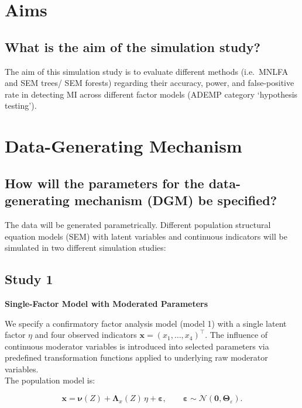 \documentclass[
  man,
  floatsintext]{apa7}
\begin{document}
\section{Aims}\label{aims}

\subsection{What is the aim of the simulation
study?}\label{what-is-the-aim-of-the-simulation-study}

The aim of this simulation study is to evaluate different methods
(i.e.~MNLFA and SEM trees/ SEM forests) regarding their accuracy, power,
and false-positive rate in detecting MI across different factor models
(ADEMP category `hypothesis testing').

\section{Data-Generating Mechanism}\label{data-generating-mechanism}

\subsection{How will the parameters for the data-generating mechanism
(DGM) be
specified?}\label{how-will-the-parameters-for-the-data-generating-mechanism-dgm-be-specified}

The data will be generated parametrically. Different population
structural equation models (SEM) with latent variables and continuous
indicators will be simulated in two different simulation studies:

\subsection{Study 1}\label{study-1}

\textbf{Single-Factor Model with Moderated Parameters}

We specify a confirmatory factor analysis model (model 1) with a single
latent factor \(\eta\) and four observed indicators
\(\mathbf{x} = (x_1, \dots, x_4)^\top\). The influence of continuous
moderator variables is introduced into selected parameters via
predefined transformation functions applied to underlying raw moderator
variables.\\
The population model is:

\[
\mathbf{x} = \boldsymbol{\nu}(Z) + \boldsymbol{\Lambda}_x(Z)\,\eta + \boldsymbol{\varepsilon},
\qquad
\boldsymbol{\varepsilon} \sim \mathcal{N}(\mathbf{0}, \boldsymbol{\Theta}_\varepsilon).
\]
\end{document}
